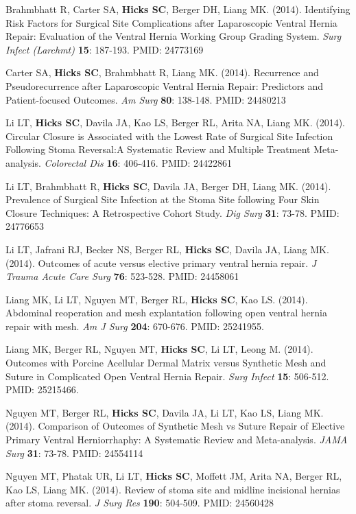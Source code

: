 \documentclass[10pt]{article}
\begin{document}
\begin{enumerate}[label= {[\arabic*]}, labelwidth=15pt]
\item Brahmbhatt R, Carter SA, {\bf Hicks SC}, Berger DH, Liang MK. (2014). Identifying Risk Factors for Surgical Site Complications after Laparoscopic Ventral Hernia Repair: Evaluation of the Ventral Hernia Working Group Grading System. {\it Surg Infect (Larchmt)} {\bf 15}: 187-193. PMID: 24773169
\item Carter SA, {\bf Hicks SC}, Brahmbhatt R, Liang MK. (2014). Recurrence and Pseudorecurrence after Laparoscopic Ventral Hernia Repair: Predictors and Patient-focused Outcomes. {\it Am Surg} {\bf 80}: 138-148. PMID: 24480213
\item Li LT, {\bf Hicks SC}, Davila JA, Kao LS, Berger RL, Arita NA, Liang MK. (2014). Circular Closure is Associated with the Lowest Rate of Surgical Site Infection Following Stoma Reversal:A Systematic Review and Multiple Treatment Meta-analysis. {\it Colorectal Dis} {\bf 16}: 406-416. PMID: 24422861
\item Li LT, Brahmbhatt R, {\bf Hicks SC}, Davila JA, Berger DH, Liang MK. (2014). Prevalence of Surgical Site Infection at the Stoma Site following Four Skin Closure Techniques: A Retrospective Cohort Study. {\it Dig Surg} {\bf 31}: 73-78. PMID: 24776653
\item Li LT, Jafrani RJ, Becker NS, Berger RL,  {\bf Hicks SC}, Davila JA, Liang MK. (2014). Outcomes of acute versus elective primary ventral hernia repair. {\it J Trauma Acute Care Surg} {\bf 76}: 523-528. PMID: 24458061
\item Liang MK, Li LT, Nguyen MT, Berger RL, {\bf Hicks SC}, Kao LS. (2014). Abdominal reoperation and mesh explantation following open ventral hernia repair with mesh. {\it Am J Surg} {\bf 204}: 670-676. PMID: 25241955. 
\item Liang MK, Berger RL, Nguyen MT, {\bf Hicks SC}, Li LT, Leong M. (2014). Outcomes with Porcine Acellular Dermal Matrix versus Synthetic Mesh and Suture in Complicated Open Ventral Hernia Repair. {\it Surg Infect} {\bf 15}: 506-512. PMID: 25215466. 
\item Nguyen MT, Berger RL, {\bf Hicks SC}, Davila JA, Li LT, Kao LS, Liang MK. (2014). Comparison of Outcomes of Synthetic Mesh vs Suture Repair of Elective Primary Ventral Herniorrhaphy: A Systematic Review and Meta-analysis. {\it JAMA Surg} {\bf 31}: 73-78. PMID: 24554114 
\item Nguyen MT, Phatak UR, Li LT, {\bf Hicks SC}, Moffett JM, Arita NA, Berger RL, Kao LS, Liang MK. (2014). Review of stoma site and midline incisional hernias after stoma reversal. {\it J Surg Res} {\bf 190}: 504-509. PMID: 24560428 

\end{enumerate}
\end{document}

